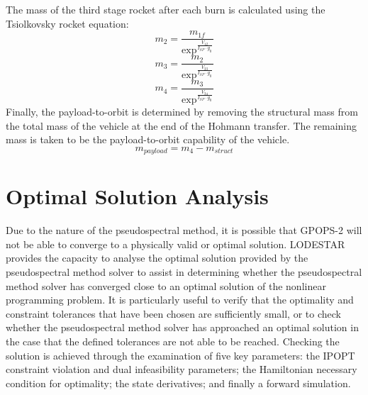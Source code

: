 The mass of the third stage rocket after each burn is calculated using the Tsiolkovsky rocket equation:
\begin{equation}
m_2 = \frac{m_{1f}}{\exp^{\frac{V_{12}}{I_{SP} \cdot g_0}}}
\end{equation}
\begin{equation}
m_3 = \frac{m_{2}}{\exp^{\frac{V_{23}}{I_{SP} \cdot g_0}}}
\end{equation}
\begin{equation}
m_4 = \frac{m_{3}}{\exp^{\frac{V_{34}}{I_{SP} \cdot g_0}}}
\end{equation}
Finally, the payload-to-orbit is determined by removing the structural mass from the total mass of the vehicle at the end of the Hohmann transfer. The remaining mass is taken to be the payload-to-orbit capability of the vehicle.
\begin{equation}
m_{payload} = m_4 - m_{struct}
\end{equation}







\section{Optimal Solution Analysis}\label{sec:verification}
Due to the nature of the pseudospectral method, it is possible that GPOPS-2 will not be able to converge to a physically valid or optimal solution. 
LODESTAR provides the capacity to analyse the optimal solution provided by the pseudospectral method solver to assist in determining whether the pseudospectral method solver has converged close to an optimal solution of the nonlinear programming problem. It is particularly useful to verify that the optimality and constraint tolerances that have been chosen are sufficiently small, or to check whether the pseudospectral method solver has approached an optimal solution in the case that the defined tolerances are not able to be reached.   
Checking the solution is achieved through the examination of five key parameters: the IPOPT constraint violation and dual infeasibility parameters; the Hamiltonian necessary condition for optimality; the state derivatives; and finally a forward simulation. 

